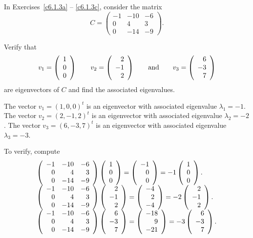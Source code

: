 \documentclass{ximera}
\begin{document}
\noindent In Exercises~\ref{c6.1.3a} -- \ref{c6.1.3c}, consider the matrix
\[
C = \left(\begin{array}{rrr} -1 & -10 & -6\\  0 & 4  & 3 \\  0  & -14  & -9
	\end{array}\right).
\]
\begin{exercise} \label{c6.1.3a}
Verify that
\[
v_1 = \left(\begin{array}{r} 1 \\ 0\\ 0\end{array}\right) \qquad
v_2 = \left(\begin{array}{r} 2 \\ -1\\ 2\end{array}\right) \quad \quad\mbox{and}\quad \quad
v_3 = \left(\begin{array}{r} 6 \\ -3\\ 7\end{array}\right)
\]
are eigenvectors of $C$ and find the associated eigenvalues.

\begin{solution}

\ans The vector $v_1 = (1,0,0)^t$ is an eigenvector with associated
eigenvalue $\lambda_1 = -1$.  The vector $v_2 = (2,-1,2)^t$ is an
eigenvector with associated eigenvalue $\lambda_2 = -2$.  The vector
$v_3 = (6,-3,7)^t$ is an eigenvector with associated eigenvalue
$\lambda_3 = -3$.

\soln To verify, compute
\[
\begin{array}{l}
\left(\begin{array}{rrr} -1 & -10 & -6 \\ 0 & 4 & 3 \\ 0 & -14 & -9\end{array}\right)\left(\begin{array}{r} 1 \\ 0 \\ 0\end{array}\right) =
\left(\begin{array}{r} -1 \\ 0 \\ 0\end{array}\right) = -1\left(\begin{array}{r} 1 \\ 0 \\ 0\end{array}\right). \\
\left(\begin{array}{rrr} -1 & -10 & -6 \\ 0 & 4 & 3 \\ 0 & -14 & -9\end{array}\right)\left(\begin{array}{r} 2 \\ -1 \\ 2\end{array}\right) =
\left(\begin{array}{r} -4 \\ 2 \\ -4\end{array}\right) = -2\left(\begin{array}{r} 2 \\ -1 \\ 2\end{array}\right). \\
\left(\begin{array}{rrr} -1 & -10 & -6 \\ 0 & 4 & 3 \\ 0 & -14 & -9\end{array}\right)\left(\begin{array}{r} 6 \\ -3 \\ 7\end{array}\right) =
\left(\begin{array}{r} -18 \\ 9 \\ -21\end{array}\right) = -3\left(\begin{array}{r} 6 \\ -3 \\ 7\end{array}\right).
\end{array}
\]

\end{solution}
\end{exercise}
\end{document}
